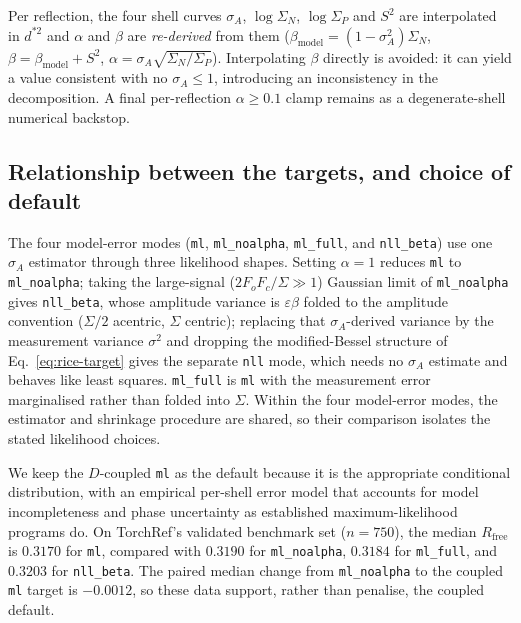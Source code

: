 \documentclass{iucrjournals}
\begin{document}
Per reflection, the four shell curves $\sigma_{A}$, $\log\Sigma_{N}$,
$\log\Sigma_{P}$ and $S^{2}$ are interpolated in $d^{\ast 2}$ and $\alpha$ and $\beta$
are \emph{re-derived} from them ($\beta_\mathrm{model} = (1-\sigma_{A}^{2})\Sigma_{N}$,
$\beta = \beta_\mathrm{model} + S^{2}$, $\alpha = \sigma_{A}\sqrt{\Sigma_{N}/\Sigma_{P}}$).
Interpolating $\beta$ directly is avoided: it can yield a value consistent with no
$\sigma_{A} \le 1$, introducing an inconsistency in the decomposition. A final per-reflection $\alpha\geq0.1$
clamp remains as a degenerate-shell numerical backstop.

\subsection{Relationship between the targets, and choice of default}

The four model-error modes (\texttt{ml}, \texttt{ml\_noalpha},
\texttt{ml\_full}, and \texttt{nll\_beta}) use one $\sigma_A$ estimator through
three likelihood shapes. Setting $\alpha = 1$ reduces \texttt{ml} to
\texttt{ml\_noalpha}; taking the large-signal
($2F_{o}F_{c}/\Sigma \gg 1$) Gaussian limit of \texttt{ml\_noalpha} gives
\texttt{nll\_beta}, whose amplitude variance is $\varepsilon\beta$ folded to the
amplitude convention ($\Sigma/2$ acentric, $\Sigma$ centric); replacing that
$\sigma_A$-derived variance by the measurement variance $\sigma^{2}$ and dropping the
modified-Bessel structure of Eq.~\ref{eq:rice-target} gives the separate
\texttt{nll} mode, which needs no $\sigma_A$ estimate and behaves like least
squares. \texttt{ml\_full} is \texttt{ml}
with the measurement error marginalised rather than folded into $\Sigma$.
Within the four model-error modes, the estimator and shrinkage procedure are
shared, so their comparison isolates the stated likelihood choices.

We keep the $D$-coupled \texttt{ml} as the default because it is the appropriate
conditional distribution, with an empirical per-shell error model that accounts for
model incompleteness and phase uncertainty as established maximum-likelihood
programs do. On TorchRef's validated benchmark set ($n=750$), the median
$R_\mathrm{free}$ is $0.3170$ for \texttt{ml}, compared with $0.3190$ for
\texttt{ml\_noalpha}, $0.3184$ for \texttt{ml\_full}, and $0.3203$ for
\texttt{nll\_beta}. The paired median change from \texttt{ml\_noalpha} to the
coupled \texttt{ml} target is $-0.0012$, so these data support, rather than
penalise, the coupled default.
\end{document}
